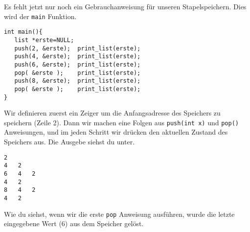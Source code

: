 Es fehlt jetzt nur noch ein Gebrauchanweisung für unseren Stapelspeichern.
Dies wird der \texttt{main} Funktion.
\begin{lstlisting}
int main(){
   list *erste=NULL;
   push(2, &erste);  print_list(erste);
   push(4, &erste);  print_list(erste);
   push(6, &erste);  print_list(erste);
   pop( &erste );    print_list(erste);
   push(8, &erste);  print_list(erste);
   pop( &erste );    print_list(erste);
}
\end{lstlisting}
Wir definieren zuerst ein Zeiger um die 
Anfangsadresse des Speichers zu speichern (Zeile 2). Dann wir machen eine
Folgen aus \texttt{push(int x)} und \texttt{pop()} Anweisungen, und im jeden Schritt wir drücken
den aktuellen Zustand des Speichers aus. Die Ausgebe siehst du unter.
\begin{lstlisting}
2	
4	2	
6	4	2	
4	2	
8	4	2	
4	2	
\end{lstlisting}
Wie du siehst, wenn wir die erste \texttt{pop} Anweisung ausführen, wurde die letzte 
eingegebene Wert (6) aus dem Speicher gelöst. 


